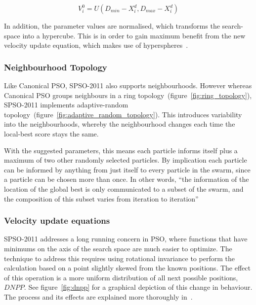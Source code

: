 \documentclass{csfourzero}
\begin{document}
\begin{equation}
  V_i^0 = U(D_{min} - X_i^d, D_{max} - X_i^d)
\end{equation}

In addition, the parameter values are normalised, which transforms the
search-space into a hypercube. This is in order to gain maximum benefit from the
new velocity update equation, which makes use of
hyperspheres~\cite{Clerc:2012to}.

\subsubsection{Neighbourhood Topology}

Like Canonical PSO, SPSO-2011 also supports neighbourhoods. However whereas
Canonical PSO groups neighbours in a ring
topology~(figure~\ref{fig:ring_topology}), SPSO-2011 implements adaptive-random
topology~(figure~\ref{fig:adaptive_random_topology}). This introduces
variability into the neighbourhoods, whereby the neighbourhood changes each
time the local-best score stays the same.

With the suggested parameters, this means each particle informs itself plus a
maximum of two other randomly selected particles. By implication each particle
can be informed by anything from just itself to every particle in the swarm,
since a particle can be chosen more than once. In other words, ``the information
of the location of the global best is only communicated to a subset of the
swarm, and the composition of this subset varies from iteration to
iteration''~\cite{Miranda:2007er}

\subsubsection{Velocity update equations}

SPSO-2011 addresses a long running concern in PSO, where functions that
have minimums on the axis of the search space are much easier to optimize. The
technique to address this requires using rotational invariance to perform the
calculation based on a point slightly skewed from the known positions. The
effect of this operation is a more uniform distribution of all next possible
positions, $DNPP$. See figure~\ref{fig:dnpp} for a graphical depiction of this
change in behaviour.  The process and its effects are explained more thoroughly
in~\cite{ZambranoBigiarini:2013dl}.
\end{document}
